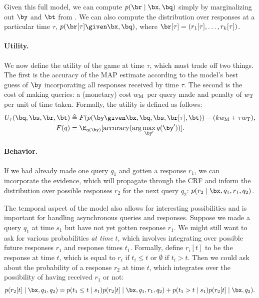 Given this full model, we can compute $p(\br \mid \bx, \bq)$ simply by marginalizing out $\by$ and $\bt$ from .
We can also compute the distribution over responses at a particular time $\tau$, $p(\br[\tau] \given \bx, \bq)$, where $\br[\tau] = (r_1[\tau], \ldots, r_k[\tau])$.

\paragraph{Utility.}

We now define the utility of the game at time $\tau$, which must trade off two things.
The first is the accuracy of the MAP estimate according to the model's best guess of $\by$ incorporating all responses received by time $\tau$.
The second is the cost of making queries: a (monetary) cost $w_\text{M}$ per query made and penalty of $w_\text{T}$ per unit of time taken.
Formally, the utility is defined as follows:
\begin{align}
  \label{eqn:utility}
  U_\tau(\bq, \bs, \br, \bt) &\eqdef F(p(\by \given \bx, \bq, \bs, \br[\tau], \bt)) - (k \weightmoney + \tau \weighttime), \\
  F(q) &= \E_{q(\by)}[\accuracy(\arg\max_{\by'} q(\by'))].
\end{align}

\paragraph{Behavior.}
If we had already made one query $q_1$ and gotten a response $r_1$,
we can incorporate the evidence, which will propagate through the CRF
and inform the distribution over possible responses $r_2$ for the next query $q_2$:
$p(r_2 \mid \bx, q_1, r_1, q_2)$.

The temporal aspect of the model also allows for interesting possibilities
and is important for handling asynchronous queries and responses.
Suppose we made a query $q_1$ at time $s_1$ but have not yet gotten response $r_1$.
We might still want to ask for various probabilities \emph{at time} $t$,
which involves integrating over possible future responses $r_1$ and response times $t_1$.
Formally, define $r_i[t]$ to be the response at time $t$, which is equal to $r_i$ if $t_i \le t$
or $\emptyset$ if $t_i > t$.
Then we could ask about the probability of a response $r_2$ at time $t$,
which integrates over the possibility of having received $r_1$ or not:
\begin{align}
p(r_2[t] \mid \bx, q_1, q_2) = p(t_1 \le t \mid s_1) p(r_2[t] \mid \bx, q_1, r_1, q_2) + p(t_1 > t \mid s_1) p(r_2[t] \mid \bx, q_2).
\end{align}

